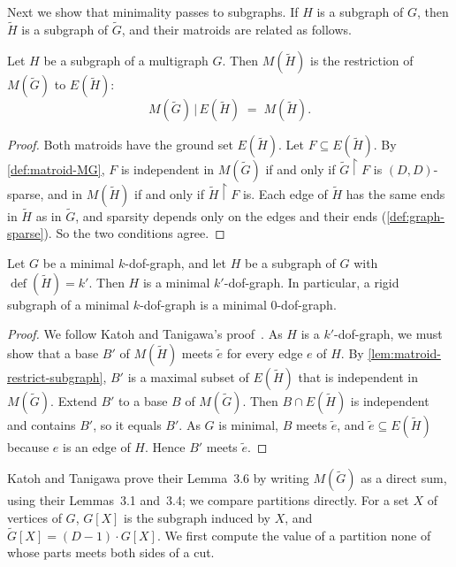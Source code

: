 Next we show that minimality passes to subgraphs. If $H$ is a subgraph
of $G$, then $\tilde H$ is a subgraph of $\tilde G$, and their matroids
are related as follows.

\begin{lemma}
  \label{lem:matroid-restrict-subgraph}
  \leanok
  Let $H$ be a subgraph of a multigraph $G$. Then $M(\tilde H)$ is the
  restriction of $M(\tilde G)$ to $E(\tilde H)$:
  \[
    M(\tilde G)\,|\,E(\tilde H) \;=\; M(\tilde H).
  \]
\end{lemma}
\begin{proof}
  \leanok
  Both matroids have the ground set $E(\tilde H)$. Let
  $F \subseteq E(\tilde H)$. By \cref{def:matroid-MG}, $F$ is
  independent in $M(\tilde G)$ if and only if $\tilde G \restriction F$
  is $(D, D)$-sparse, and in $M(\tilde H)$ if and only if
  $\tilde H \restriction F$ is. Each edge of $\tilde H$ has the same ends
  in $\tilde H$ as in $\tilde G$, and sparsity depends only on the edges
  and their ends (\cref{def:graph-sparse}). So the two conditions agree.
\end{proof}

\begin{lemma}
  \label{lem:subgraph-minimality}
  \leanok
  Let $G$ be a minimal $k$-dof-graph, and let $H$ be a subgraph of $G$
  with $\operatorname{def}(\tilde H) = k'$. Then $H$ is a minimal
  $k'$-dof-graph. In particular, a rigid subgraph of a minimal
  $k$-dof-graph is a minimal $0$-dof-graph.
\end{lemma}
\begin{proof}
  \leanok
  We follow Katoh and Tanigawa's
  proof~\cite[p.~657]{katohTanigawa2011}. As $H$ is a $k'$-dof-graph,
  we must show that a base $B'$ of $M(\tilde H)$ meets $\tilde e$ for
  every edge $e$ of $H$. By
  \cref{lem:matroid-restrict-subgraph}, $B'$ is a maximal subset of
  $E(\tilde H)$ that is independent in $M(\tilde G)$. Extend $B'$ to a
  base $B$ of $M(\tilde G)$. Then $B \cap E(\tilde H)$ is independent
  and contains $B'$, so it equals $B'$. As $G$ is minimal, $B$ meets
  $\tilde e$, and $\tilde e \subseteq E(\tilde H)$ because $e$ is an
  edge of $H$. Hence $B'$ meets $\tilde e$.
\end{proof}

Katoh and Tanigawa prove their Lemma~3.6 by writing $M(\tilde G)$ as a
direct sum, using their Lemmas~3.1 and~3.4; we compare partitions
directly. For
a set $X$ of vertices of $G$, $G[X]$ is the subgraph induced by $X$, and
$\tilde G[X] = (D-1)\cdot G[X]$. We first compute the value of a
partition none of whose parts meets both sides of a cut.

